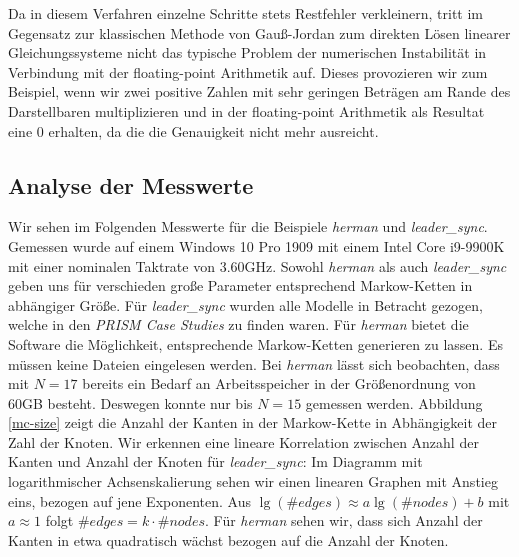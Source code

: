 \documentclass[a4paper]{article}
\newcommand{\mc}{Markow-Kette}
\theoremstyle{nonumberplain}
\begin{document}
Da in diesem Verfahren einzelne Schritte stets Restfehler verkleinern, tritt im Gegensatz zur klassischen Methode von Gauß-Jordan zum direkten Lösen linearer Gleichungssysteme nicht das typische Problem der numerischen Instabilität in Verbindung mit der floating-point Arithmetik auf. Dieses provozieren wir zum Beispiel, wenn wir zwei positive Zahlen mit sehr geringen Beträgen am Rande des Darstellbaren multiplizieren und in der floating-point Arithmetik als Resultat eine $0$ erhalten, da die die Genauigkeit nicht mehr ausreicht.

\subsection{Analyse der Messwerte}


Wir sehen im Folgenden Messwerte für die Beispiele \textit{herman} und \textit{leader\_sync}. Gemessen wurde auf einem Windows 10 Pro 1909 mit einem Intel Core i9-9900K mit einer nominalen Taktrate von 3.60GHz.
Sowohl \textit{herman} als auch \textit{leader\_sync} geben uns für verschieden große Parameter entsprechend \mc{}n in abhängiger Größe. Für \textit{leader\_sync} wurden alle Modelle in Betracht gezogen, welche in den \textit{PRISM Case Studies} \cite{PRISMCS} zu finden waren. Für \textit{herman} bietet die Software die Möglichkeit, entsprechende \mc{}n generieren zu lassen. Es müssen keine Dateien eingelesen werden. Bei \textit{herman} lässt sich beobachten, dass mit $N=17$ bereits ein Bedarf an Arbeitsspeicher in der Größenordnung von 60GB besteht. Deswegen konnte nur bis $N=15$ gemessen werden. Abbildung \ref{mc-size} zeigt die Anzahl der Kanten in der \mc{} in Abhängigkeit der Zahl der Knoten. Wir erkennen eine lineare Korrelation zwischen Anzahl der Kanten und Anzahl der Knoten für \textit{leader\_sync}: Im Diagramm mit logarithmischer Achsenskalierung sehen wir einen linearen Graphen mit Anstieg eins, bezogen auf jene Exponenten. Aus $\lg (\#edges) \approx a \lg (\#nodes) + b$ mit $a \approx 1$ folgt $\#edges = k \cdot \#nodes$. Für \textit{herman} sehen wir, dass sich Anzahl der Kanten in etwa quadratisch wächst bezogen auf die Anzahl der Knoten.
\end{document}
